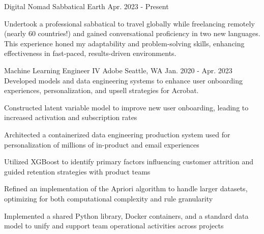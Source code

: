 
%
% 
% 
%
%
%
%
%
% 

\begin{cventries}

\cventry
    {Digital Nomad} %
    {Sabbatical} %
    {Earth} %
    {Apr. 2023 - Present} %
    {\parbox[t]{\linewidth}{Undertook a professional sabbatical to travel globally while freelancing remotely (nearly 60 countries!) and gained conversational proficiency in two new languages. This experience honed my adaptability and problem-solving skills, enhancing effectiveness in fast-paced, results-driven environments.}} %
    {} %

\cventry
    {Machine Learning Engineer IV} %
    {Adobe} %
    {Seattle, WA} %
    {Jan. 2020 - Apr. 2023} %
    {Developed models and data engineering systems to enhance user onboarding experiences, personalization, and upsell strategies for Acrobat.} %
    {
      \begin{cvitems} %
        \item {Constructed latent variable model to improve new user onboarding, leading to increased activation and subscription rates}
        \item {Architected a containerized data engineering production system used for personalization of millions of in-product and email experiences}
        \item {Utilized XGBoost to identify primary factors influencing customer attrition and guided retention strategies with product teams}
        \item {Refined an implementation of the Apriori algorithm to handle larger datasets, optimizing for both computational complexity and rule granularity}
        \item {Implemented a shared Python library, Docker containers, and a standard data model to unify and support team operational activities across projects}
      \end{cvitems}
    }


\end{cventries}
